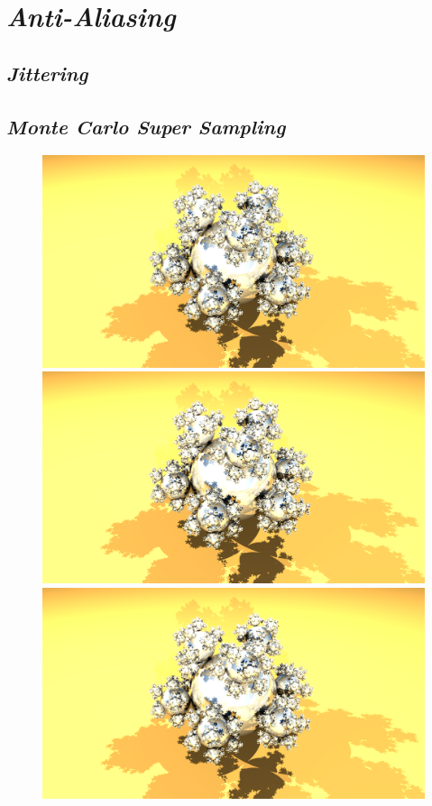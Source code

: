 \documentclass{article}
\begin{document}
    \section*{\textit{Anti-Aliasing}}
        \subsection*{\textit{Jittering}}
            \par

        \subsection*{\textit{Monte Carlo Super Sampling}}
            \par


        \begin{figure}[h]
            \centering
            \includegraphics[scale=0.08]{aa00}
            \includegraphics[scale=0.08]{aajt}
            \includegraphics[scale=0.08]{aamc}

\end{figure}
\end{document}
